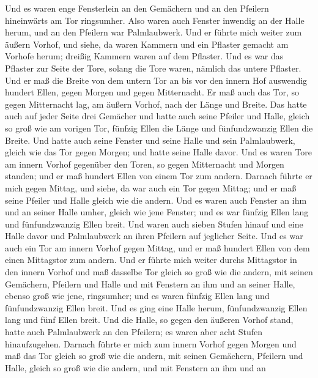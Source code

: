 Und es waren enge Fensterlein an den Gemächern und an den
Pfeilern hineinwärts am Tor ringsumher. Also waren auch Fenster inwendig
an der Halle herum, und an den Pfeilern war Palmlaubwerk. 
Und er führte mich weiter zum äußern Vorhof, und siehe, da waren Kammern
und ein Pflaster gemacht am Vorhofe herum; dreißig Kammern waren auf dem
Pflaster.  Und es war das Pflaster zur Seite der Tore,
solang die Tore waren, nämlich das untere Pflaster.  Und er
maß die Breite von dem untern Tor an bis vor den innern Hof auswendig
hundert Ellen, gegen Morgen und gegen Mitternacht.  Er maß
auch das Tor, so gegen Mitternacht lag, am äußern Vorhof, nach der Länge
und Breite.  Das hatte auch auf jeder Seite drei Gemächer
und hatte auch seine Pfeiler und Halle, gleich so groß wie am vorigen
Tor, fünfzig Ellen die Länge und fünfundzwanzig Ellen die Breite.
 Und hatte auch seine Fenster und seine Halle und sein
Palmlaubwerk, gleich wie das Tor gegen Morgen; und hatte seine Halle
davor.  Und es waren Tore am innern Vorhof gegenüber den
Toren, so gegen Mitternacht und Morgen standen; und er maß hundert Ellen
von einem Tor zum andern.  Darnach führte er mich gegen
Mittag, und siehe, da war auch ein Tor gegen Mittag; und er maß seine
Pfeiler und Halle gleich wie die andern.  Und es waren auch
Fenster an ihm und an seiner Halle umher, gleich wie jene Fenster; und
es war fünfzig Ellen lang und fünfundzwanzig Ellen breit. 
Und waren auch sieben Stufen hinauf und eine Halle davor und
Palmlaubwerk an ihren Pfeilern auf jeglicher Seite.  Und es
war auch ein Tor am innern Vorhof gegen Mittag, und er maß hundert Ellen
von dem einen Mittagstor zum andern.  Und er führte mich
weiter durchs Mittagstor in den innern Vorhof und maß dasselbe Tor
gleich so groß wie die andern,  mit seinen Gemächern,
Pfeilern und Halle und mit Fenstern an ihm und an seiner Halle, ebenso
groß wie jene, ringsumher; und es waren fünfzig Ellen lang und
fünfundzwanzig Ellen breit.  Und es ging eine Halle herum,
fünfundzwanzig Ellen lang und fünf Ellen breit.  Und die
Halle, so gegen den äußeren Vorhof stand, hatte auch Palmlaubwerk an den
Pfeilern; es waren aber acht Stufen hinaufzugehen.  Darnach
führte er mich zum innern Vorhof gegen Morgen und maß das Tor gleich so
groß wie die andern,  mit seinen Gemächern, Pfeilern und
Halle, gleich so groß wie die andern, und mit Fenstern an ihm und an
